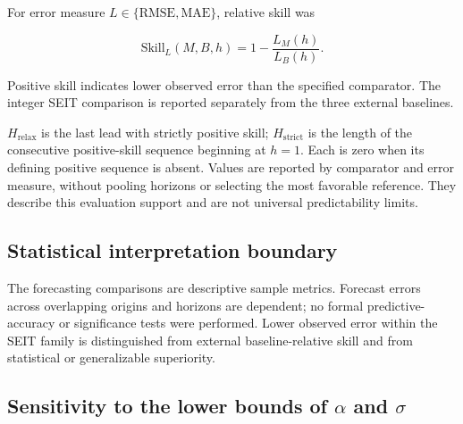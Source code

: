 \documentclass[pdflatex,sn-mathphys-ay]{sn-jnl}
\begin{document}
For error measure $L\in\{\mathrm{RMSE},\mathrm{MAE}\}$, relative skill was

\[
\mathrm{Skill}_L(M,B,h)=1-\frac{L_M(h)}{L_B(h)}.
\]

Positive skill indicates lower observed error than the specified comparator. The integer SEIT comparison is reported separately from the three external baselines.

$H_{\mathrm{relax}}$ is the last lead with strictly positive skill; $H_{\mathrm{strict}}$ is the length of the consecutive positive-skill sequence beginning at $h=1$. Each is zero when its defining positive sequence is absent. Values are reported by comparator and error measure, without pooling horizons or selecting the most favorable reference. They describe this evaluation support and are not universal predictability limits.

\subsection{Statistical interpretation boundary}

The forecasting comparisons are descriptive sample metrics. Forecast errors across overlapping origins and horizons are dependent; no formal predictive-accuracy or significance tests were performed. Lower observed error within the SEIT family is distinguished from external baseline-relative skill and from statistical or generalizable superiority.

\subsection{Sensitivity to the lower bounds of \texorpdfstring{$\alpha$}{alpha} and \texorpdfstring{$\sigma$}{sigma}}\label{sec:sensmethods}
\end{document}
